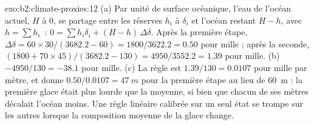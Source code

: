 \begin{solution}{exo:b2:climate-proxies:12}
(a) Par unité de surface océanique, l'eau de l'océan actuel, $H$ à 0, se partage entre les réserves
$h_i$ à $\delta_i$ et l'océan restant $H - h$, avec $h = \sum h_i$~: $0 = \sum h_i\delta_i +
(H - h)\,\Delta\delta$. Après la première étape, $\Delta\delta = 60 \times 30/(3682.2 - 60) =
1800/3622.2 = 0.50$ pour mille ; après la seconde, $(1800 + 70 \times 45)/(3682.2 - 130) =
4950/3552.2 = 1.39$ pour mille. (b) $-4950/130 = -38.1$ pour mille. (c) La règle est $1.39/130 = 0.0107$
pour mille par mètre, et donne $0.50/0.0107 = \qty{47}{m}$ pour la première étape au lieu de
\qty{60}{m} : la première glace était plus lourde que la moyenne, si bien que chacun de ses mètres décalait l'océan
moins. Une règle linéaire calibrée sur un seul état se trompe sur les autres lorsque la composition moyenne de la
glace change.
\end{solution}

